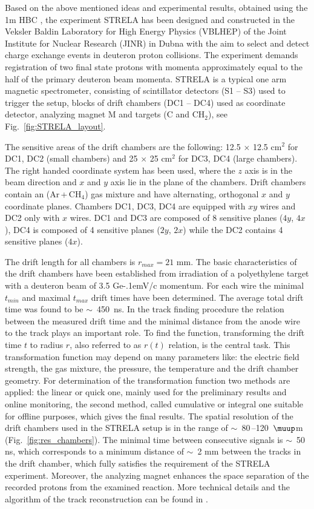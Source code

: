 \documentclass[twocolumn,epjc3]{svjour3}
\newcommand{\GeVc}   {Ge\kern-.1emV/c\xspace}
\begin{document}
Based on the above mentioned ideas and experimental results, obtained using the
1m HBC \cite{gla02,gla08}, the experiment STRELA has been designed and
constructed in the Veksler Baldin Laboratory for High Energy Physics (VBLHEP) of
the Joint Institute for Nuclear Research (JINR) in Dubna with the aim to select
and detect charge exchange events in deuteron proton collisions. The experiment
demands registration of two final state protons with momenta approximately equal
to the half of the primary deuteron beam momenta. STRELA is a typical one arm
magnetic spectrometer, consisting of scintillator detectors (S1 -- S3) used to
trigger the setup, blocks of drift chambers (DC1 -- DC4) used as coordinate
detector, analyzing magnet M and targets (C and CH$_2$), see
Fig.~\ref{fig:STRELA_layout}.

The sensitive areas of the drift chambers are the following: 12.5 $\times$ 12.5
cm$^2$ for DC1, DC2 (small chambers) and 25 $\times$ 25 cm$^2$ for DC3, DC4
(large chambers). The right handed coordinate system has been used, where the
$z$ axis is in the beam direction and $x$ and $y$ axis lie in the plane of the
chambers. Drift chambers contain an (Ar\,+\,CH$_4$) gas mixture and have
alternating, orthogonal $x$ and $y$ coordinate planes. Chambers DC1, DC3, DC4
are equipped with $xy$ wires and DC2 only with $x$ wires. DC1 and DC3 are
composed of 8 sensitive planes ($4y$, $4x$), DC4 is composed of 4 sensitive
planes ($2y$, $2x$) while the DC2 contains 4 sensitive planes ($4x$).

The drift length for all chambers is $r_{max} = 21$ mm. The basic
characteristics of the drift chambers have been established from irradiation of
a polyethylene target with a deuteron beam of 3.5 \GeVc momentum. For each wire
the minimal $t_{min}$ and maximal $t_{max}$ drift times have been
determined. The average total drift time was found to be $\sim$~450~ns. In the
track finding procedure the relation between the measured drift time and the
minimal distance from the anode wire to the track plays an important role. To
find the function, transforming the drift time $t$ to radius $r$, also referred
to as $r(t)$ relation, is the central task. This transformation function may
depend on many parameters like: the electric field strength, the gas mixture,
the pressure, the temperature and the drift chamber geometry. For determination
of the transformation function two methods are applied: the linear or quick one,
mainly used for the preliminary results and online monitoring, the second
method, called cumulative or integral one suitable for offline purposes, which
gives the final results. The spatial resolution of the drift chambers used in
the STRELA setup is in the range of $\sim$~80\,--120~$\muup$m
(Fig.~\ref{fig:res_chambers}). The minimal time between consecutive signals is
$\sim$~50 ns, which corresponds to a minimum distance of $\sim$~2 mm between the
tracks in the drift chamber, which fully satisfies the requirement of the STRELA
experiment. Moreover, the analyzing magnet enhances the space separation of the
recorded protons from the examined reaction. More technical details and the
algorithm of the track reconstruction can be found in \cite{gla13}.
\end{document}
